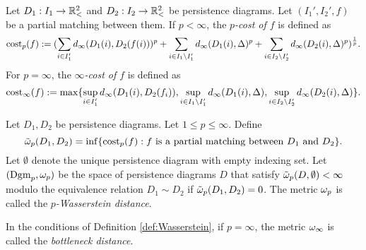 \begin{definition}[$p$-cost] \label{def:pcost}
    Let $ D_1: I_1 \to \mathbb{R}_<^2 $ and $ D_2: I_2 \to \mathbb{R}_<^2 $ be persistence diagrams. Let $ (I_1', I_2', f) $ be a partial matching between them. If $ p < \infty $, the {\it $p$-cost of $ f $} is defined as
    \begin{equation}
        \operatorname{cost}_p(f) := (\sum_{i \in I_1'} d_\infty(D_1(i), D_2(f(i)))^p
        + \sum_{i \in I_1 \setminus I_1'} d_\infty(D_1(i), \Delta)^p
        + \sum_{i \in I_2 \setminus I_2'} d_\infty(D_2(i), \Delta)^p )^{\frac{1}{p}}.
    \end{equation}
    For $ p = \infty $, the {\it $\infty$-cost of $ f $} is defined as
    \begin{equation}
        \operatorname{cost}_\infty(f) := \max \{\sup_{i \in I_1'} d_\infty(D_1(i), D_2(f_i)),
        \sup_{i\in I_1 \setminus I_1'} d_\infty(D_1(i), \Delta),
        \sup_{i\in I_2 \setminus I_2'} d_\infty(D_2(i), \Delta)\}.
    \end{equation}
\end{definition}

\begin{definition} \label{def:Wasserstein}
    Let $ D_1, D_2 $ be persistence diagrams. Let $ 1 \leq p \leq \infty $. Define
    \begin{equation}
        \tilde \omega_p (D_1, D_2) = \inf \{\operatorname{cost}_p(f) : f \text{ is a partial matching between } D_1 \text{ and } D_2 \}.
    \end{equation}
    Let $ \emptyset $ denote the unique persistence diagram with empty indexing set. Let $ (\operatorname{Dgm}_p, \omega_p) $ be the space of persistence diagrams $ D $ that satisfy $ \tilde \omega_p(D, \emptyset) < \infty $ modulo the equivalence relation $ D_1 \sim D_2 $ if $ \tilde \omega_p (D_1, D_2) = 0 $. The metric $ \omega_p $ is called the {\it $p$-Wasserstein distance}.
\end{definition}

\begin{definition} \label{def:bot-dist-2}
    In the conditions of Definition \ref{def:Wasserstein}, if $ p = \infty $, the metric $ \omega_\infty $ is called the {\it bottleneck distance}.
\end{definition}

